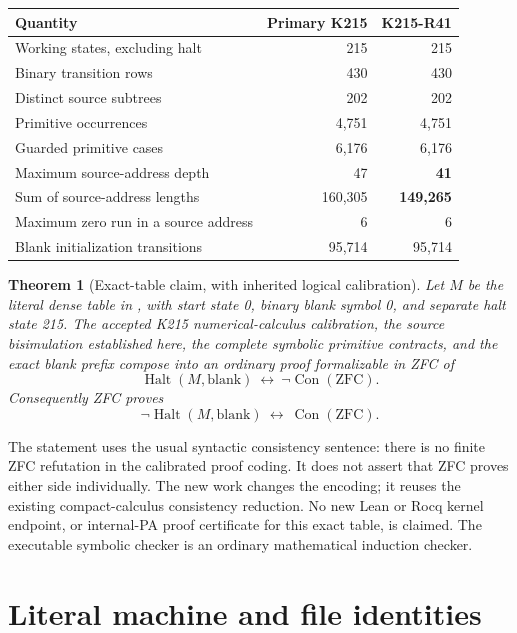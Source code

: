 \documentclass[11pt]{article}
\newtheorem{theorem}{Theorem}
\newcommand{\Con}{\operatorname{Con}}
\newcommand{\Halt}{\operatorname{Halt}}
\newcommand{\file}[1]{\texttt{\detokenize{#1}}}
\begin{document}
\begin{center}
\begin{tabular}{lrr}
\toprule
Quantity & Primary K215 & K215-R41\\
\midrule
Working states, excluding halt & 215 & 215\\
Binary transition rows & 430 & 430\\
Distinct source subtrees & 202 & 202\\
Primitive occurrences & 4,751 & 4,751\\
Guarded primitive cases & 6,176 & 6,176\\
Maximum source-address depth & 47 & \textbf{41}\\
Sum of source-address lengths & 160,305 & \textbf{149,265}\\
Maximum zero run in a source address & 6 & 6\\
Blank initialization transitions & 95,714 & 95,714\\
\bottomrule
\end{tabular}
\end{center}

\begin{theorem}[Exact-table claim, with inherited logical calibration]
Let $M$ be the literal dense table in \file{machine/k215r.tm}, with
start state 0, binary blank symbol 0, and separate halt state 215.
The accepted K215 numerical-calculus calibration, the source
bisimulation established here, the complete symbolic primitive
contracts, and the exact blank prefix compose into an ordinary proof
formalizable in ZFC of
\[
 \Halt(M,\mathrm{blank})\ \longleftrightarrow\ \neg\Con(\mathrm{ZFC}).
\]
Consequently ZFC proves
\[
 \neg\Halt(M,\mathrm{blank})\ \longleftrightarrow\ \Con(\mathrm{ZFC}).
\]
\end{theorem}

The statement uses the usual syntactic consistency sentence: there is
no finite ZFC refutation in the calibrated proof coding. It does not
assert that ZFC proves either side individually. The new work changes
the encoding; it reuses the existing compact-calculus consistency
reduction. No new Lean or Rocq kernel endpoint, or internal-PA proof
certificate for this exact table, is claimed. The executable symbolic
checker is an ordinary mathematical induction checker.

\section{Literal machine and file identities}
\end{document}
